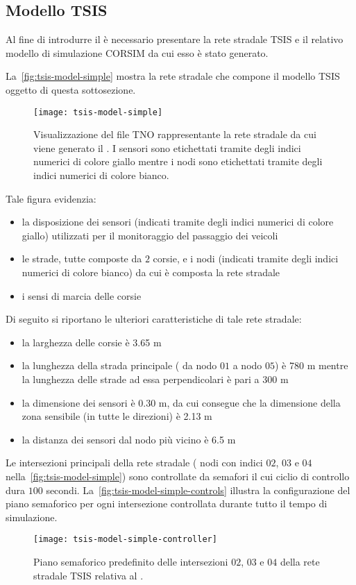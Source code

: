 \subsection{Modello TSIS}\label{subsec:tsis-simple-model}
Al fine di introdurre il  è necessario presentare la rete stradale \acs{TSIS} e il relativo modello di simulazione \acs{CORSIM} da cui esso è stato generato.

La~\vref{fig:tsis-model-simple} mostra la rete stradale che compone il modello \acs{TSIS} oggetto di questa sottosezione.
\begin{figure}[H]
  	\centering
  	\texttt{[image: tsis-model-simple]}%
  	\caption[Rete stradale relativa al ]{Visualizzazione del file \acs{TNO} rappresentante la rete stradale da cui viene generato il . I sensori sono etichettati tramite degli indici numerici di colore giallo mentre i nodi sono etichettati tramite degli indici numerici di colore bianco.}
	\label{fig:tsis-model-simple}
\end{figure}
Tale figura evidenzia:
\begin{itemize}
	\item la disposizione dei sensori (indicati tramite degli indici numerici di colore giallo) utilizzati per il monitoraggio del passaggio dei veicoli
	\item le strade, tutte composte da $2$ corsie, e i nodi (indicati tramite degli indici numerici di colore bianco) da cui è composta la rete stradale
	\item i sensi di marcia delle corsie
\end{itemize}
Di seguito si riportano le ulteriori caratteristiche di tale rete stradale:
\begin{itemize}
	\item la larghezza delle corsie è \num{3.65} \si{\metre}
	\item la lunghezza della strada principale (\ie{} da nodo $01$ a nodo $05$) è \num{780} \si{\metre} mentre la lunghezza delle strade ad essa perpendicolari è pari a \num{300} \si{\metre}
	\item la dimensione dei sensori è \num{0.30} \si{\metre}, da cui consegue che la dimensione della zona sensibile (in tutte le direzioni) è \num{2.13} \si{\metre}
	\item la distanza dei sensori dal nodo più vicino è \num{6.5} \si{\metre}
\end{itemize}

Le intersezioni principali della rete stradale (\ie{} nodi con indici $02$, $03$ e $04$ nella~\vref{fig:tsis-model-simple}) sono controllate da semafori il cui ciclio di controllo dura $100$ secondi. La~\vref{fig:tsis-model-simple-controls} illustra la configurazione del piano semaforico per ogni intersezione controllata durante tutto il tempo di simulazione.
\begin{figure}[H]
	\centering
	\texttt{[image: tsis-model-simple-controller]}
	\caption[Piano semaforico relativo al ]{Piano semaforico predefinito delle intersezioni $02$, $03$ e $04$ della rete stradale \acs{TSIS} relativa al .}
	\label{fig:tsis-model-simple-controls}
\end{figure}

